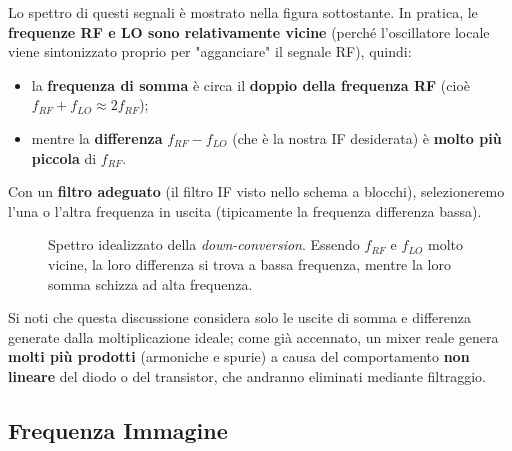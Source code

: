 \documentclass[openany,a4paper,12pt]{book}
\begin{document}
Lo spettro di questi segnali è mostrato nella figura sottostante. In pratica, le \textbf{frequenze RF e LO sono relativamente vicine} (perché l'oscillatore locale viene sintonizzato proprio per "agganciare" il segnale RF), quindi:
\begin{itemize}[label=\textcolor{PoliBlue}{\textbullet}]
    \item la \textbf{frequenza di somma} è circa il \textbf{doppio della frequenza RF} (cioè $f_{RF} + f_{LO} \approx 2f_{RF}$);
    \item mentre la \textbf{differenza} $f_{RF} - f_{LO}$ (che è la nostra IF desiderata) è \textbf{molto più piccola} di $f_{RF}$.
\end{itemize}

Con un \textbf{filtro adeguato} (il filtro IF visto nello schema a blocchi), selezioneremo l'una o l'altra frequenza in uscita (tipicamente la frequenza differenza bassa).

\begin{figure}[H]
    \centering
    \caption*{Spettro idealizzato della \textit{down-conversion}. Essendo $f_{RF}$ e $f_{LO}$ molto vicine, la loro differenza si trova a bassa frequenza, mentre la loro somma schizza ad alta frequenza.}
\end{figure}

Si noti che questa discussione considera solo le uscite di somma e differenza generate dalla moltiplicazione ideale; come già accennato, un mixer reale genera \textbf{molti più prodotti} (armoniche e spurie) a causa del comportamento \textbf{non lineare} del diodo o del transistor, che andranno eliminati mediante filtraggio.


\subsection{Frequenza Immagine}
\end{document}
